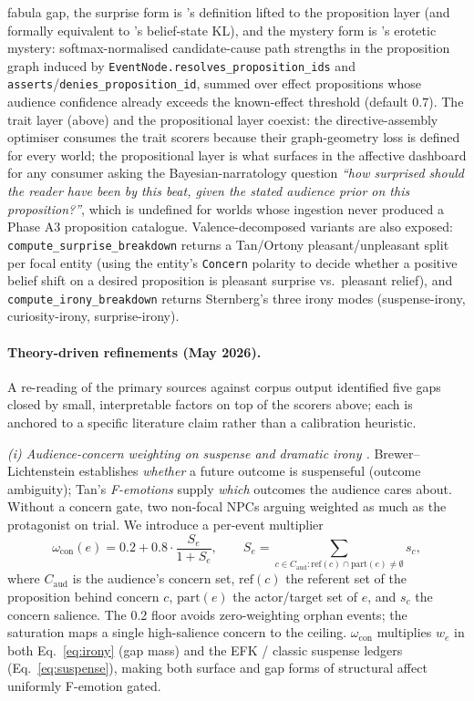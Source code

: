 \documentclass[11pt]{article}
\begin{document}
fabula gap, the surprise form is \citeauthor{ittibaldi2009surprise}'s
definition lifted to the proposition layer (and formally equivalent
to \citeauthor{schmidhuber1995rdia}'s belief-state KL), and the
mystery form is \citeauthor{carroll2007closure}'s erotetic mystery:
softmax-normalised candidate-cause path strengths in the
proposition graph induced by
\texttt{EventNode.resolves\_proposition\_ids} and
\texttt{asserts}/\texttt{denies\_proposition\_id}, summed over
effect propositions whose audience confidence already exceeds the
known-effect threshold (default $0.7$). The trait layer (above)
and the propositional layer coexist: the directive-assembly
optimiser consumes the trait scorers because their graph-geometry
loss is defined for every world; the propositional layer is what
surfaces in the affective dashboard for any consumer asking the
Bayesian-narratology question \emph{``how surprised should the
reader have been by this beat, given the stated audience prior on
this proposition?''}, which is undefined for worlds whose
ingestion never produced a Phase A3 proposition catalogue.
Valence-decomposed variants are also exposed:
\texttt{compute\_surprise\_breakdown} returns a Tan/Ortony
pleasant/unpleasant split per focal entity (using the entity's
\texttt{Concern} polarity to decide whether a positive belief
shift on a desired proposition is pleasant surprise vs.\
pleasant relief), and \texttt{compute\_irony\_breakdown} returns
Sternberg's three irony modes (suspense-irony, curiosity-irony,
surprise-irony).

\paragraph{Theory-driven refinements (May 2026).}
A re-reading of the primary sources against corpus output
identified five gaps closed by small, interpretable factors on
top of the scorers above; each is anchored to a specific
literature claim rather than a calibration heuristic.

\emph{(i) Audience-concern weighting on suspense and dramatic
irony \citep{tan1996emotion}.} Brewer--Lichtenstein establishes
\emph{whether} a future outcome is suspenseful (outcome
ambiguity); Tan's \emph{F-emotions} supply \emph{which} outcomes
the audience cares about. Without a concern gate, two non-focal
NPCs arguing weighted as much as the protagonist on trial. We
introduce a per-event multiplier
\begin{equation}
\omega_{\mathrm{con}}(e) = 0.2 + 0.8 \cdot \frac{S_e}{1 + S_e},
\qquad
S_e = \!\!\!\!\sum_{c \in C_{\mathrm{aud}}: \mathrm{ref}(c) \cap \mathrm{part}(e) \neq \emptyset}\!\!\!\!\! s_c,
\end{equation}
where $C_{\mathrm{aud}}$ is the audience's concern set,
$\mathrm{ref}(c)$ the referent set of the proposition behind
concern $c$, $\mathrm{part}(e)$ the actor/target set of $e$, and
$s_c$ the concern salience. The 0.2 floor avoids
zero-weighting orphan events; the saturation maps a single
high-salience concern to the ceiling. $\omega_{\mathrm{con}}$
multiplies $w_e$ in both Eq.~\ref{eq:irony} (gap mass) and the
EFK / classic suspense ledgers (Eq.~\ref{eq:suspense}), making
both surface and gap forms of structural affect uniformly
F-emotion gated.
\end{document}
